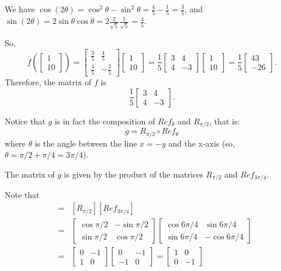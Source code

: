 We have $\cos(2\theta) = \cos^2\theta - \sin^2\theta = \frac{4}{5}-\frac{1}{5}=\frac{3}{5}$, and $\sin(2\theta) = 2\sin\theta\cos\theta = 2\frac{2}{\sqrt{5}}\frac{1}{\sqrt{5}}=\frac{4}{5}$.

So,
$$
f\left(\left[\begin{array}{c}1\\10\end{array} \right]\right) =
\left[\begin{array}{cc}\frac{3}{5}&\frac{4}{5} \\ \frac{4}{5}&-\frac{3}{5}\end{array} \right]\left[\begin{array}{c}1\\10\end{array} \right]=\frac{1}{5}\left[\begin{array}{cc}3&4\\4&-3\end{array} \right]\left[\begin{array}{c}1\\10\end{array} \right]=\frac{1}{5}\left[\begin{array}{c}43\\-26\end{array} \right].
$$
Therefore, the matrix of $f$ is
$$
\frac{1}{5}\left[\begin{array}{cc}3&4\\4&-3\end{array}\right].
$$

\vspace{2mm}
Notice that $g$ is in fact the composition of $Ref_{\theta}$ and $R_{\pi/2}$, that is:
$$
g= R_{\pi/2} \circ Ref_{\theta}
$$
where $\theta$ is the angle between the line $x=-y$ and the x-axis (so, $\theta=\pi/2+\pi/4=3\pi/4$).

The matrix of $g$ is given by the product of the matrices $R_{\pi/2}$ and $Ref_{3\pi/4}$.

Note that
\begin{eqnarray*}
[g]&=&[R_{\pi/2}][Ref_{3\pi/4}]\\
&=&\left[\begin{array}{cc}\cos\pi/2&-\sin\pi/2\\ \sin\pi/2&\cos\pi/2 \end{array}\right]
\left[\begin{array}{cc}\cos6\pi/4& \sin6\pi/4\\ \sin6\pi/4&-\cos6\pi/4 \end{array}\right]\\
&=&\left[\begin{array}{cc}0&-1\\ 1&0 \end{array}\right]
\left[\begin{array}{cc}0&-1\\ -1&0 \end{array}\right]=\left[\begin{array}{cc}1&0\\ 0&-1 \end{array}\right]
\end{eqnarray*}

